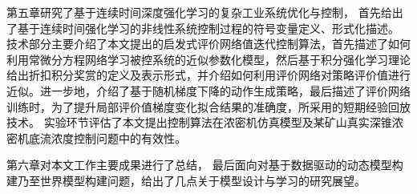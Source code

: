 第五章研究了基于连续时间深度强化学习的复杂工业系统优化与控制，
首先给出了基于连续时间强化学习的非线性系统控制过程的符号变量定义、形式化描述。
技术部分主要介绍了本文提出的启发式评价网络值迭代控制算法，首先描述了如何利用常微分方程网络学习被控系统的近似参数化模型，然后基于积分强化学习理论给出折扣积分奖赏的定义及表示形式，并介绍如何利用评价网络对策略评价值进行近似。进一步地，介绍了基于随机梯度下降的动作生成策略，最后描述了评价网络训练时，为了提升局部评价值梯度变化拟合结果的准确度，所采用的短期经验回放技术。
实验环节评估了本文提出控制算法在浓密机仿真模型及某矿山真实深锥浓密机底流浓度控制问题中的有效性。


第六章对本文工作主要成果进行了总结，
最后面向对基于数据驱动的动态模型构建乃至世界模型构建问题，给出了几点关于模型设计与学习的研究展望。
